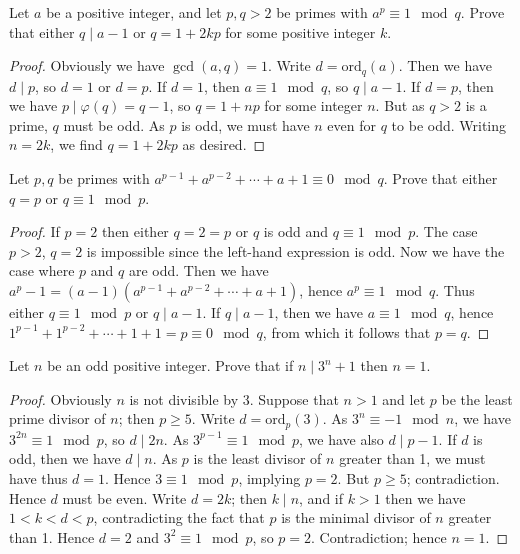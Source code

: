 \begin{prb}
Let $a$ be a positive integer, and let $p, q > 2$ be primes with $a^p\equiv1\mod{q}$.  Prove that either $q \mid a-1$ or $q = 1+2kp$ for some positive integer $k$.
\begin{proof}
Obviously we have $\gcd{(a,q)} = 1$.  Write $d = \text{ord}_q(a)$.
Then we have $d\mid p$, so $d = 1$ or $d = p$.  If $d = 1$, then $a
\equiv 1\mod{q}$, so $q \mid a-1$.  If $d = p$, then we have $p \mid
\varphi(q) = q-1$, so $q = 1+np$ for some integer $n$.  But as $q >
2$ is a prime, $q$ must be odd.  As $p$ is odd, we must have $n$
even for $q$ to be odd.  Writing $n = 2k$, we find $q = 1+2kp$ as
desired.
\end{proof}
\end{prb}
\begin{prb}
Let $p, q$ be primes with $a^{p-1}+a^{p-2}+\cdots+a+1 \equiv0\mod{q}$.  Prove that either $q = p$ or $q \equiv 1\mod{p}$.
\begin{proof}
If $p = 2$ then either $q = 2 = p$ or $q$ is odd and $q \equiv 1\mod{p}$.  The case $p > 2$, $q = 2$ is impossible since the left-hand expression is odd.  Now we have the case where $p$ and $q$ are odd.  Then we have $a^p-1 = (a-1)(a^{p-1}+a^{p-2}+\cdots+a+1)$, hence $a^p \equiv 1\mod{q}$.  Thus either $q \equiv 1\mod{p}$ or $q \mid a-1$.  If $q \mid a-1$, then we have $a \equiv 1\mod{q}$, hence $1^{p-1}+1^{p-2}+\cdots+1+1 = p\equiv0\mod{q}$, from which it follows that $p = q$.
\end{proof}
\end{prb}
\begin{prb}
Let $n$ be an odd positive integer.  Prove that if $n \mid 3^n + 1$ then $n = 1$.
\begin{proof}
Obviously $n$ is not divisible by 3.  Suppose that $n > 1$ and let $p$ be the least prime divisor of $n$; then $p \ge 5$.  Write $d = \text{ord}_p(3)$.  As $3^n \equiv -1\mod{n}$, we have $3^{2n} \equiv 1\mod{p}$, so $d \mid 2n$.  As $3^{p-1}\equiv1\mod{p}$, we have also $d \mid p-1$.  If $d$ is odd, then we have $d \mid n$.  As $p$ is the least divisor of $n$ greater than 1, we must have thus $d = 1$.  Hence $3\equiv1\mod{p}$, implying $p = 2$.  But $p \ge 5$; contradiction.  Hence $d$ must be even.  Write $d = 2k$; then $k \mid n$, and if $k > 1$ then we have $1 < k < d < p$, contradicting the fact that $p$ is the minimal divisor of $n$ greater than 1.  Hence $d = 2$ and $3^2\equiv1\mod{p}$, so $p = 2$.  Contradiction; hence $n = 1$.
\end{proof}
\end{prb}

